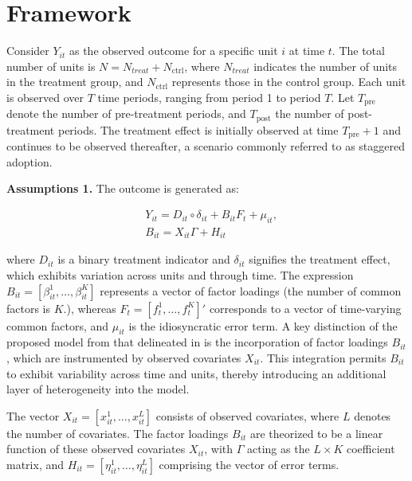 \documentclass[12pt]{article}
\begin{document}
 
\section{Framework} 
\label{sec: framework}

Consider $Y_{it}$ as the observed outcome for a specific unit $i$ at time $t$. The total number of units is $N = N_{treat} + N_{\text{ctrl}}$, where $N_{treat}$ indicates the number of units in the treatment group, and $N_{\text{ctrl}}$ represents those in the control group. Each unit is observed over $T$ time periods, ranging from period 1 to period $T$. Let $T_{\text{pre}}$ denote the number of pre-treatment periods, and $T_{\text{post}}$ the number of post-treatment periods. The treatment effect is initially observed at time $T_{\text{pre}} + 1$ and continues to be observed thereafter, a scenario commonly referred to as staggered adoption.

\textbf{Assumptions 1.} The outcome is generated as:

\begin{equation}
\begin{aligned}
& Y_{it} = D_{it} \circ \delta_{it} + B_{it}F_{t} + \mu_{it}, \\
& B_{it} = X_{it}\Gamma + H_{it}
\end{aligned}
\tag{1}
\label{eq: functional form}
\end{equation}

\noindent where $D_{it}$ is a binary treatment indicator and $\delta_{it}$ signifies the treatment effect, which exhibits variation across units and through time. The expression $B_{it} = [\beta_{it}^1, \ldots, \beta_{it}^K]$ represents a vector of factor loadings (the number of common factors is $K$.), whereas $F_{t} = [f_{t}^1, \ldots, f_{t}^K]'$ corresponds to a vector of time-varying common factors, and $\mu_{it}$ is the idiosyncratic error term. A key distinction of the proposed model from that delineated in \cite{xu2017generalized} is the incorporation of factor loadings $B_{it}$, which are instrumented by observed covariates $X_{it}$. This integration permits $B_{it}$ to exhibit variability across time and units, thereby introducing an additional layer of heterogeneity into the model.

The vector $X_{it} = [x_{it}^1, \ldots, x_{it}^L]$ consists of observed covariates, where $L$ denotes the number of covariates. The factor loadings $B_{it}$ are theorized to be a linear function of these observed covariates $X_{it}$, with $\Gamma$ acting as the $L\times K$ coefficient matrix, and $H_{it} = [\eta_{it}^1, \ldots, \eta_{it}^L]$ comprising the vector of error terms.
\end{document}
